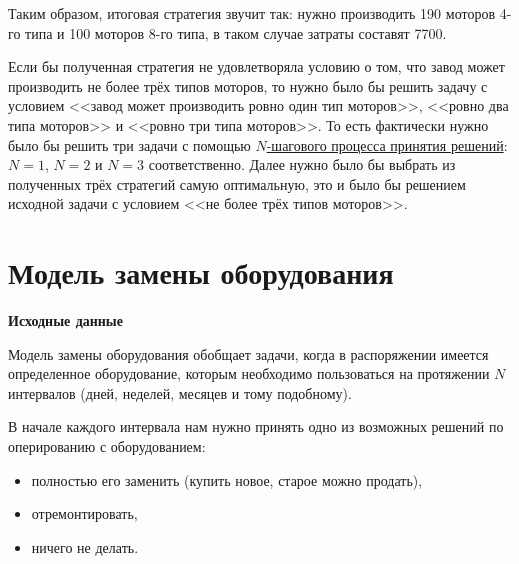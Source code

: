 Таким образом, итоговая стратегия звучит так: нужно производить 190 моторов 4-го типа и 100 моторов 8-го типа, в таком случае затраты составят 7700.

\begin{note}
	Если бы полученная стратегия не удовлетворяла условию о том, что завод может производить не более трёх типов моторов, то нужно было бы решить задачу с условием <<завод может производить ровно один тип моторов>>, <<ровно два типа моторов>> и <<ровно три типа моторов>>. То есть фактически нужно было бы решить три задачи с помощью \hyperref[alg:n_step_process]{$N$-шагового процесса принятия решений}: $N = 1$, $N = 2$ и $N = 3$ соответственно. Далее нужно было бы выбрать из полученных трёх стратегий самую оптимальную, это и было бы решением исходной задачи с условием <<не более трёх типов моторов>>.
\end{note}

\section{Модель замены оборудования}

\label{def:equipment_replacement_model}

\textbf{Исходные данные}

Модель замены оборудования обобщает задачи, когда в распоряжении имеется определенное оборудование, которым необходимо пользоваться на протяжении $N$ интервалов (дней, неделей, месяцев и тому подобному).

\begin{figure}[H]
	\centering
{}
\end{figure}

В начале каждого интервала нам нужно принять одно из возможных решений по оперированию с оборудованием:

\begin{itemize}[nosep]
	\item полностью его заменить (купить новое, старое можно продать),
	
	\item отремонтировать,
	
	\item ничего не делать.
\end{itemize}

